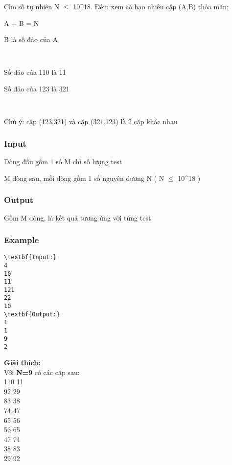 

Cho số tự nhiên N  $\le$  10^18. Đếm xem có bao nhiêu cặp (A,B) thỏa mãn:

A + B = N

B là số đảo của A

 

Số đảo của 110 là 11

Số đảo của 123 là 321

 

Chú ý: cặp (123,321) và cặp (321,123) là 2 cặp khác nhau

\subsubsection{Input}

Dòng đầu gồm 1 số M chỉ số lượng test

M dòng sau, mỗi dòng gồm 1 số nguyên dương N ( N  $\le$  10^18 )

\subsubsection{Output}

Gồm M dòng, là kết quả tương ứng với từng test

\subsubsection{Example}
\begin{verbatim}
\textbf{Input:}
4
10
11
121
22
10
\textbf{Output:}
1
1
9
2\end{verbatim}

\textbf{Giải thích:}
\\Với\textbf{ N=9} có các cặp sau:
\\110 11
\\92 29
\\83 38
\\74 47
\\65 56
\\56 65
\\47 74
\\38 83
\\29 92

 
